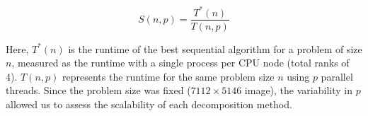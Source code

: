 \begin{displaymath}
    S(n, p) = \frac{T^*(n)}{T(n, p)}
\end{displaymath}

Here, \(T^*(n)\) is the runtime of the best sequential algorithm for a problem of size \(n\), measured as the runtime with a single process per CPU node (total ranks of 4). \(T(n, p)\) represents the runtime for the same problem size \(n\) using \(p\) parallel threads. Since the problem size was fixed (\(7112 \times 5146\) image), the variability in \(p\) allowed us to assess the scalability of each decomposition method.